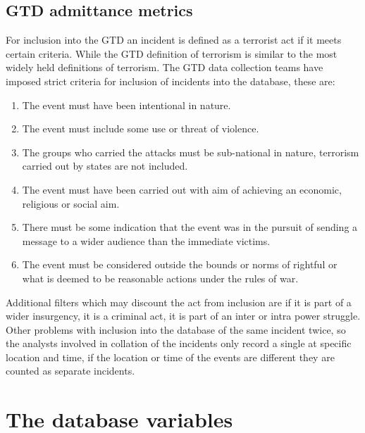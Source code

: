 \subsection{GTD admittance metrics}
For inclusion into the GTD an incident is defined as a terrorist act if it meets certain criteria. While the GTD definition of terrorism is similar to the most widely held definitions of terrorism. The GTD data collection teams have imposed strict criteria for inclusion of incidents into the database, these are:
\begin{enumerate}
\item The event must have been intentional in nature.
\item The event must include some use or threat of violence.
\item The groups who carried the attacks must be sub-national in nature, terrorism carried out by states are not included.
\item The event must have been carried out with aim of achieving an economic, religious or social aim.
\item There must be some indication that the event was in the pursuit of sending a message to a wider audience than the immediate victims.
\item  The event must be considered outside the bounds or norms of rightful or what is deemed to be reasonable actions under the rules of war.
\end{enumerate}

Additional filters which may discount the act from inclusion are if it is part of a wider insurgency, it is a criminal act, it is part of an inter or intra power struggle.
Other problems with inclusion into the database of the same incident twice, so the analysts involved in collation of the incidents only record a single at specific location and time, if the location or time of the events are different they are counted as separate incidents.

\section{The database variables}

